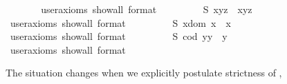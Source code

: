 \begin{isabellebody}
\ \isanewline
\ \ \ \ \isamarkupfalse%
\ {\isacharbrackleft}user{\isacharunderscore}axioms{\isacharcomma}\ show{\isacharunderscore}all{\isacharcomma}\ format\ {\isacharequal}\ {}{\isacharbrackright}%
\isadelimproof
\ %
\endisadelimproof
%
\isatagproof
{}\isamarkupfalse%
%
\endisatagproof
{\isafoldproof}%
%
\isadelimproof
%
\endisadelimproof
\ \isanewline
\ \ \isamarkupfalse%
\ S{}{\isacharcolon}\ {\isachardoublequoteopen}x{\isasymcdot}{\isacharparenleft}y{\isasymcdot}z{\isacharparenright}\ {\isasymcong}\ {\isacharparenleft}x{\isasymcdot}y{\isacharparenright}{\isasymcdot}z{\isachardoublequoteclose}\ \ \ %
\ \isanewline
\ \ \ \ \isamarkupfalse%
\ {\isacharbrackleft}user{\isacharunderscore}axioms{\isacharcomma}\ show{\isacharunderscore}all{\isacharcomma}\ format\ {\isacharequal}\ {}{\isacharbrackright}%
\isadelimproof
\ %
\endisadelimproof
%
\isatagproof
{}\isamarkupfalse%
%
\endisatagproof
{\isafoldproof}%
%
\isadelimproof
%
\endisadelimproof
\ \isanewline
\ \ \isamarkupfalse%
\ S{}{\isacharcolon}\ {\isachardoublequoteopen}x{\isasymcdot}{\isacharparenleft}dom\ x{\isacharparenright}\ {\isasymcong}\ x{\isachardoublequoteclose}\ \ \ %
\ \isanewline
\ \ \ \ \isamarkupfalse%
\ {\isacharbrackleft}user{\isacharunderscore}axioms{\isacharcomma}\ show{\isacharunderscore}all{\isacharcomma}\ format\ {\isacharequal}\ {}{\isacharbrackright}%
\isadelimproof
\ %
\endisadelimproof
%
\isatagproof
{}\isamarkupfalse%
%
\endisatagproof
{\isafoldproof}%
%
\isadelimproof
%
\endisadelimproof
\ \isanewline
\ \ \isamarkupfalse%
\ S{}{\isacharcolon}\ {\isachardoublequoteopen}{\isacharparenleft}cod\ y{\isacharparenright}{\isasymcdot}y\ {\isasymcong}\ y{\isachardoublequoteclose}\ \ \ %
\ \isanewline
\ \ \ \ \isamarkupfalse%
\ {\isacharbrackleft}user{\isacharunderscore}axioms{\isacharcomma}\ show{\isacharunderscore}all{\isacharcomma}\ format\ {\isacharequal}\ {}{\isacharbrackright}%
\isadelimproof
\ %
\endisadelimproof
%
\isatagproof
{}\isamarkupfalse%
%
\endisatagproof
{\isafoldproof}%
%
\isadelimproof
%
\endisadelimproof
%
\begin{isamarkuptext}%
The situation changes when we explicitly postulate strictness of ,

\end{isamarkuptext}
\end{isabellebody}
